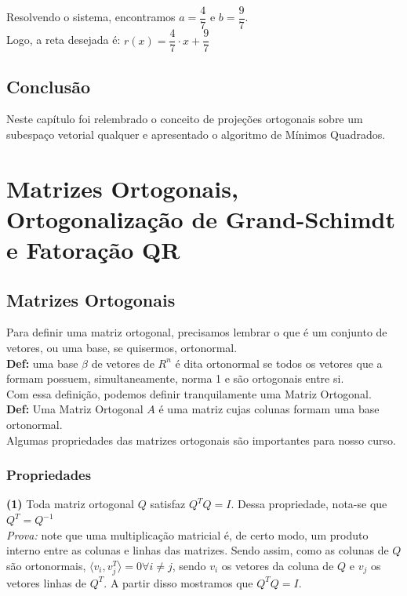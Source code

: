 \documentclass[12pt]{article}
\begin{document}
Resolvendo o sistema, encontramos $a=\dfrac{4}{7}$ e $b=\dfrac{9}{7}$.\\

Logo, a reta desejada é: $r(x)=\dfrac{4}{7}\cdot x + \dfrac{9}{7}$

\subsection{Conclusão}
Neste capítulo foi relembrado o conceito de projeções ortogonais sobre um subespaço vetorial qualquer e apresentado o algoritmo de Mínimos Quadrados.


\section{Matrizes Ortogonais, Ortogonalização de Grand-Schimdt e Fatoração QR}

\subsection{Matrizes Ortogonais}

Para definir uma matriz ortogonal, precisamos lembrar o que é um conjunto de vetores, ou uma base, se quisermos, ortonormal.\\

\textbf{Def:} uma base $\beta$ de vetores de $R^n$ é dita ortonormal se todos os vetores que a formam possuem, simultaneamente, norma 1 e são ortogonais entre si.\\

Com essa definição, podemos definir tranquilamente uma Matriz Ortogonal.\\

\textbf{Def:} Uma Matriz Ortogonal $A$ é uma matriz cujas colunas formam uma base ortonormal. \\

Algumas propriedades das matrizes ortogonais são importantes para nosso curso.

\subsubsection{Propriedades}

\textbf{(1)} Toda matriz ortogonal $Q$ satisfaz $Q^{T}Q=I$. Dessa propriedade, nota-se que $Q^T=Q^{-1}$\\

\textit{Prova:} note que uma multiplicação matricial é, de certo modo, um produto interno entre as colunas e linhas das matrizes. Sendo assim, como as colunas de $Q$ são ortonormais, $\langle v_i,v^{T}_{j} \rangle=0 \forall i\neq j$, sendo $v_i$ os vetores da coluna de $Q$ e $v_j$ os vetores linhas de $Q^T$. A partir disso mostramos que $Q^TQ=I$.  \\
\end{document}
